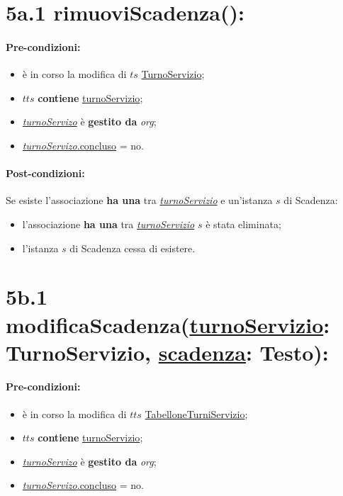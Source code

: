 \section*{5a.1 rimuoviScadenza():}

\paragraph{Pre-condizioni:}
\begin{itemize}
\item è in corso la modifica di $ts$ \underline{TurnoServizio};
 \item $tts$ \textbf{contiene} \underline{turnoServizio};
     \item \underline{\textit{turnoServizo}} è \textbf{gestito da} {\textit{org}};
   \item \underline{\textit{turnoServizo}.concluso} = no.
\end{itemize}

\paragraph{Post-condizioni:} Se esiste l'associazione \textbf{ha una} tra \underline{\textit{turnoServizio}} e un'istanza $s$ di Scadenza:

\begin{itemize}
\item l'associazione \textbf{ha una} tra \underline{\textit{turnoServizio}} $s$ è stata eliminata;
 \item l'istanza $s$ di Scadenza cessa di esistere.
\end{itemize}

\section*{5b.1 modificaScadenza(\underline{turnoServizio}: TurnoServizio, \underline{scadenza}: Testo):}

\paragraph{Pre-condizioni:}
\begin{itemize}
\item è in corso la modifica di $tts$ \underline{TabelloneTurniServizio};
 \item $tts$ \textbf{contiene} \underline{turnoServizio};
 \item \underline{\textit{turnoServizo}} è \textbf{gestito da} {\textit{org}};
 \item \underline{\textit{turnoServizo}.concluso} = no.
\end{itemize}

